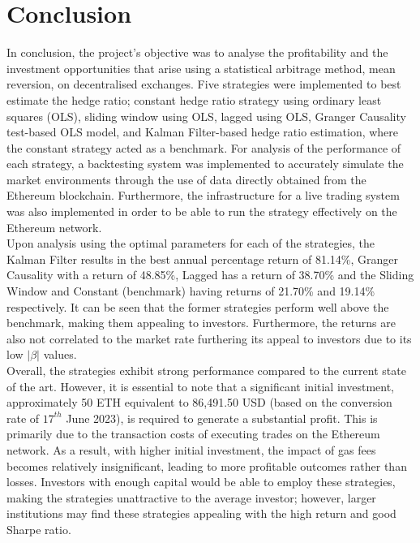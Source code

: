 \chapter{Conclusion}

In conclusion, the project's objective was to analyse the profitability and the investment opportunities that arise using a statistical arbitrage method, mean reversion, on decentralised exchanges. Five strategies were implemented to best estimate the hedge ratio; constant hedge ratio strategy using ordinary least squares (OLS), sliding window using OLS, lagged using OLS, Granger Causality test-based OLS model, and Kalman Filter-based hedge ratio estimation, where the constant strategy acted as a benchmark. For analysis of the performance of each strategy, a backtesting system was implemented to accurately simulate the market environments through the use of data directly obtained from the Ethereum blockchain. Furthermore, the infrastructure for a live trading system was also implemented in order to be able to run the strategy effectively on the Ethereum network.
\\[3mm]
Upon analysis using the optimal parameters for each of the strategies, the Kalman Filter results in the best annual percentage return of 81.14\%, Granger Causality with a return of 48.85\%, Lagged has a return of 38.70\% and the Sliding Window and Constant (benchmark) having returns of 21.70\% and 19.14\% respectively. It can be seen that the former strategies perform well above the benchmark, making them appealing to investors. Furthermore, the returns are also not correlated to the market rate furthering its appeal to investors due to its low $|\beta|$ values.
\\[3mm]
Overall, the strategies exhibit strong performance compared to the current state of the art. However, it is essential to note that a significant initial investment, approximately 50 ETH equivalent to 86,491.50 USD (based on the conversion rate of $17^{th}$ June 2023), is required to generate a substantial profit. This is primarily due to the transaction costs of executing trades on the Ethereum network. As a result, with higher initial investment, the impact of gas fees becomes relatively insignificant, leading to more profitable outcomes rather than losses. Investors with enough capital would be able to employ these strategies, making the strategies unattractive to the average investor; however, larger institutions may find these strategies appealing with the high return and good Sharpe ratio.

